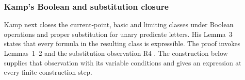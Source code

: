 
\subsubsection{Kamp's Boolean and substitution closure}
\label{sec:p09-kamp-iii2-lemma3}

Kamp next closes the current-point, basic and limiting classes under Boolean
operations and proper substitution for unary predicate letters. His
Lemma~3 states that every formula in the resulting class is expressible.
The proof invokes Lemmas~1--2 and the substitution observation R4
\cite[ch.~III, pp.~59--60, 67, 73]{Kamp1968}.
The construction below supplies that observation with its variable
conditions and gives an expression at every finite construction step.

